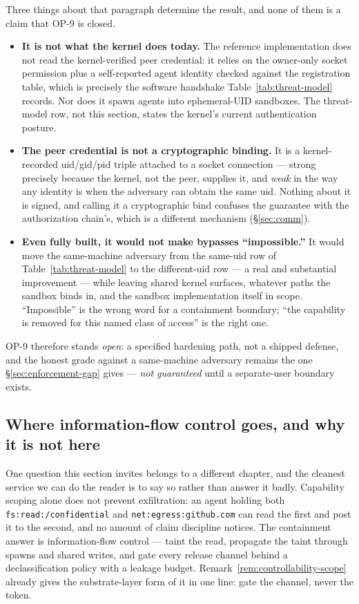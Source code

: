 \documentclass[11pt,a4paper]{article}
\newcommand{\NotGuar}{{\textcolor{hhink}{\textit{not guaranteed}}}}
\newcommand{\Open}{{\textcolor{hhgray}{\textit{open}}}}
\theoremstyle{definition}
\theoremstyle{remark}
\begin{document}
Three things about that paragraph determine the result, and none of them is a claim that
OP-9 is closed.

\begin{itemize}[leftmargin=1.4em,itemsep=2pt]
  \item \textbf{It is not what the kernel does today.} The reference implementation
  does not read the kernel-verified peer credential: it relies on the owner-only
  socket permission plus a self-reported agent identity checked against the
  registration table, which is precisely the software handshake
  Table~\ref{tab:threat-model} records. Nor does it spawn agents into ephemeral-UID
  sandboxes. The threat-model row, not this section, states the kernel's current
  authentication posture.
  \item \textbf{The peer credential is not a cryptographic binding.} It is a
  kernel-recorded uid/gid/pid triple attached to a socket connection --- strong
  precisely because the kernel, not the peer, supplies it, and \emph{weak} in the
  way any identity is when the adversary can obtain the same uid. Nothing about it
  is signed, and calling it a cryptographic bind confuses the guarantee with the
  authorization chain's, which is a different mechanism (\S\ref{sec:comm}).
  \item \textbf{Even fully built, it would not make bypasses ``impossible.''} It
  would move the same-machine adversary from the same-uid row of
  Table~\ref{tab:threat-model} to the different-uid row --- a real and substantial
  improvement --- while leaving shared kernel surfaces, whatever paths the sandbox
  binds in, and the sandbox implementation itself in scope. ``Impossible'' is the
  wrong word for a containment boundary; ``the capability is removed for this
  named class of access'' is the right one.
\end{itemize}

\noindent OP-9 therefore stands \Open{}: a specified hardening path, not a shipped
defense, and the honest grade against a same-machine adversary remains the one
\S\ref{sec:enforcement-gap} gives --- \NotGuar{} until a separate-user boundary
exists.

\subsection{Where information-flow control goes, and why it is not here}
\label{sec:ifc-airlock}

One question this section invites belongs to a different chapter, and the cleanest
service we can do the reader is to say so rather than answer it badly. Capability
scoping alone does not prevent exfiltration: an agent holding both
\texttt{fs:read:/confidential} and \texttt{net:egress:github.com} can read the first
and post it to the second, and no amount of claim discipline notices. The
containment answer is information-flow control --- taint the read, propagate the
taint through spawns and shared writes, and gate every release channel behind a
declassification policy with a leakage budget. Remark~\ref{rem:controllability-scope}
already gives the substrate-layer form of it in one line: gate the channel, never
the token.
\end{document}
